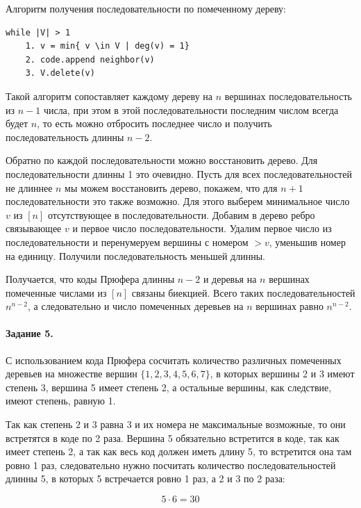 \documentclass[a4paper,12pt]{article}
\begin{document}
\begin{Solution}
Алгоритм получения последовательности по помеченному дереву:

\begin{lstlisting}
while |V| > 1
	1. v = min{ v \in V | deg(v) = 1}
	2. code.append neighbor(v)
	3. V.delete(v)
\end{lstlisting}

Такой алгоритм сопоставляет каждому дереву на $n$ вершинах последовательность из $n-1$ числа, при этом в этой последовательности последним числом всегда будет $n$, то есть можно отбросить последнее число и получить последовательность длинны $n-2$.

Обратно по каждой последовательности можно восстановить дерево. Для последовательности длинны 1 это очевидно.
Пусть для всех последовательностей не длиннее $n$ мы можем восстановить дерево, покажем, что для $n+1$ последовательности это также возможно. Для этого выберем минимальное число $v$ из $\left[n\right]$ отсутствующее в последовательности. Добавим в дерево ребро связывающее $v$ и первое число последовательности. Удалим первое число из последовательности и перенумеруем вершины с номером $>v$, уменьшив номер на единицу. Получили последовательность меньшей длинны.

Получается, что коды Прюфера длинны $n-2$ и деревья на $n$ вершинах помеченные числами из $\left[n\right]$ связаны биекцией. Всего таких последовательностей $n^{n-2}$, а следовательно и число помеченных деревьев на $n$ вершинах равно $n^{n-2}$.
\end{Solution}

\paragraph{Задание 5.} С использованием кода Прюфера сосчитать количество различных помеченных деревьев на множестве вершин $\lbrace1, 2, 3, 4, 5, 6, 7\rbrace$, в которых вершины 2 и 3 имеют степень 3, вершина 5 имеет степень 2, а остальные вершины, как следствие, имеют степень, равную 1.

\begin{Solution}
Так как степень $2$ и $3$ равна 3 и их номера не максимальные возможные, то они встретятся в коде по 2 раза. Вершина 5 обязательно встретится в коде, так как имеет степень 2, а так как весь код должен иметь длину 5, то встретится она там ровно 1 раз, следовательно нужно посчитать количество последовательностей длинны 5, в которых 5 встречается ровно 1 раз, а 2 и 3 по 2 раза:

\[
	5 \cdot 6 = 30
\]
\end{Solution}
\end{document}
